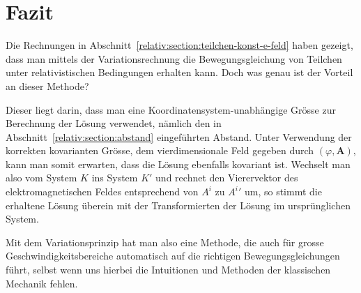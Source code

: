 
\section{Fazit 
\label{relativ:section:fazit}}

Die Rechnungen in Abschnitt~\ref{relativ:section:teilchen-konst-e-feld}
haben gezeigt, dass man mittels der Variationsrechnung
die Bewegungsgleichung von Teilchen unter relativistischen
Bedingungen erhalten kann.
Doch was genau ist der Vorteil an dieser Methode?

Dieser liegt darin, dass man eine
Koordinatensystem-unabhängige Grösse zur Berechnung
der Lösung verwendet, nämlich den in Abschnitt~\ref{relativ:section:abstand}
eingeführten Abstand.
Unter Verwendung der korrekten kovarianten Grösse,
dem vierdimensionale Feld gegeben durch \((\varphi, \bm{A})\),
kann man somit erwarten, dass die Lösung ebenfalls kovariant ist.
Wechselt man also vom System \(K\) ins System \(K'\) und
rechnet den Vierervektor des elektromagnetischen Feldes entsprechend
von \(A^i\) zu \({A^i}'\) um, so stimmt die erhaltene Lösung
überein mit der Transformierten der Lösung im ursprünglichen System.

Mit dem Variationsprinzip hat man also eine Methode,
die auch für grosse Geschwindigkeitsbereiche automatisch
auf die richtigen Bewegungsgleichungen führt, selbst wenn uns
hierbei die Intuitionen und Methoden der klassischen Mechanik fehlen.
